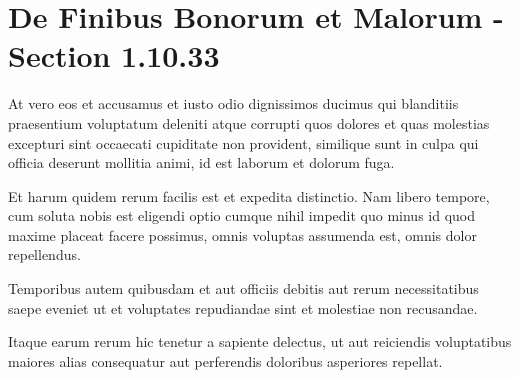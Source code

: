 \section{De Finibus Bonorum et Malorum - Section 1.10.33}

At vero eos et accusamus et iusto odio dignissimos ducimus qui blanditiis praesentium voluptatum deleniti atque corrupti quos dolores et quas molestias excepturi sint occaecati cupiditate non provident, similique sunt in culpa qui officia deserunt mollitia animi, id est laborum et dolorum fuga.  

Et harum quidem rerum facilis est et expedita distinctio. Nam libero tempore, cum soluta nobis est eligendi optio cumque nihil impedit quo minus id quod maxime placeat facere possimus, omnis voluptas assumenda est, omnis dolor repellendus.  

Temporibus autem quibusdam et aut officiis debitis aut rerum necessitatibus saepe eveniet ut et voluptates repudiandae sint et molestiae non recusandae.  

Itaque earum rerum hic tenetur a sapiente delectus, ut aut reiciendis voluptatibus maiores alias consequatur aut perferendis doloribus asperiores repellat.

